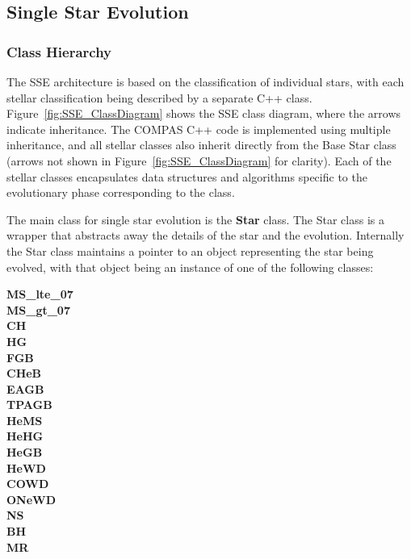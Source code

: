 \subsection{Single Star Evolution}\label{sec:SingleStarEvolution}

\subsubsection{Class Hierarchy}\label{sec:SSEClassHierarchy}

The SSE architecture is based on the classification of individual stars, with each stellar classification being described by a separate C++ class. Figure~\ref{fig:SSE_ClassDiagram} shows the SSE class diagram, where the arrows indicate inheritance.  The COMPAS C++ code is implemented using multiple inheritance, and all stellar classes also inherit directly from the Base Star class (arrows not shown in Figure~\ref{fig:SSE_ClassDiagram} for clarity). Each of the stellar classes encapsulates data structures and algorithms specific to the evolutionary phase corresponding to the class.

The main class for single star evolution is the \textbf{Star} class. The Star class is a wrapper that abstracts away the details of the star and the evolution.  Internally the Star class maintains a pointer to an object representing the star being evolved, with that object being an instance of one of the following classes:

\bigskip
\hfill
\begin{minipage}{\dimexpr\textwidth-2em}
    \textbf{MS\_lte\_07} \\
    \textbf{MS\_gt\_07} \\
    \textbf{CH} \\
    \textbf{HG} \\
    \textbf{FGB} \\
    \textbf{CHeB} \\
    \textbf{EAGB} \\
    \textbf{TPAGB} \\
    \textbf{HeMS} \\
    \textbf{HeHG} \\
    \textbf{HeGB \\}
    \textbf{HeWD} \\
    \textbf{COWD} \\
    \textbf{ONeWD} \\
    \textbf{NS} \\
    \textbf{BH} \\
    \textbf{MR} \\
\end{minipage}

